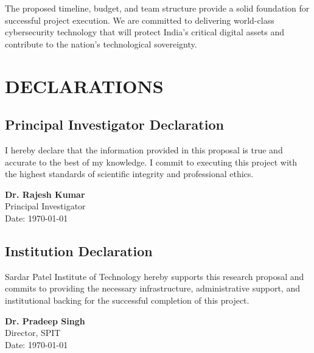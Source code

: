 \documentclass[12pt,a4paper]{article}
\begin{document}
The proposed timeline, budget, and team structure provide a solid foundation for successful project execution. We are committed to delivering world-class cybersecurity technology that will protect India's critical digital assets and contribute to the nation's technological sovereignty.

\section*{DECLARATIONS}

\subsection*{Principal Investigator Declaration}
I hereby declare that the information provided in this proposal is true and accurate to the best of my knowledge. I commit to executing this project with the highest standards of scientific integrity and professional ethics.

\vspace{1cm}
\noindent
\textbf{Dr. Rajesh Kumar} \\
Principal Investigator \\
Date: \today

\subsection*{Institution Declaration}
Sardar Patel Institute of Technology hereby supports this research proposal and commits to providing the necessary infrastructure, administrative support, and institutional backing for the successful completion of this project.

\vspace{1cm}
\noindent
\textbf{Dr. Pradeep Singh} \\
Director, SPIT \\
Date: \today
\end{document}
